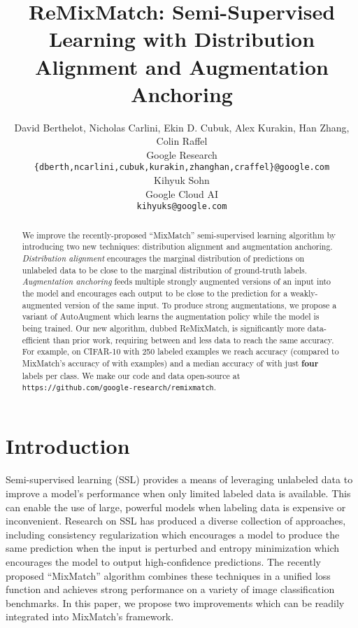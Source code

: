 \documentclass{article} \usepackage{iclr2020_conference,times}
\title{ReMixMatch: Semi-Supervised Learning with Distribution Alignment and Augmentation Anchoring}
\author{
  David Berthelot, Nicholas Carlini, Ekin D. Cubuk, Alex Kurakin, Han Zhang, Colin Raffel \\
  Google Research \\
  \texttt{\{dberth,ncarlini,cubuk,kurakin,zhanghan,craffel\}@google.com} \\
  \And
  Kihyuk Sohn \\
  Google Cloud AI \\
  \texttt{kihyuks@google.com}
}
\newif\ifarxiv\arxivtrue
\begin{document}
\maketitle
\ifarxiv
{}
\fi

\begin{abstract}

We improve the recently-proposed ``MixMatch'' semi-supervised learning algorithm 
by introducing two new techniques: distribution alignment and augmentation anchoring.
\emph{Distribution alignment} encourages the marginal distribution of predictions on unlabeled data to be close to the marginal distribution of ground-truth labels.
\emph{Augmentation anchoring} feeds multiple strongly augmented versions of an input into the model and encourages each output to be close to the prediction for a weakly-augmented version of the same input.
To produce strong augmentations, we propose a variant of AutoAugment which learns the augmentation policy while the model is being trained.
Our new algorithm, dubbed ReMixMatch, is
significantly more data-efficient than prior work,
requiring between  and  less data to reach the same accuracy.
For example, on CIFAR-10 with 250 labeled examples we reach  accuracy
(compared to MixMatch's accuracy of  with  examples)
and a median accuracy of  with just \textbf{four} labels per class.
We make our code and data open-source at
\texttt{https://github.com/google-research/remixmatch}.

\end{abstract}

\section{Introduction}

Semi-supervised learning (SSL) provides a means of leveraging unlabeled data to improve a model's performance when only limited labeled data is available.
This can enable the use of large, powerful models when labeling data is expensive or inconvenient.
Research on SSL has produced a diverse collection of approaches, including consistency regularization \citep{sajjadi2016regularization,laine2016temporal} which encourages a model to produce the same prediction when the input is perturbed and entropy minimization \citep{grandvalet2005semi} which encourages the model to output high-confidence predictions. 
The recently proposed ``MixMatch'' algorithm \citep{berthelot2019mixmatch} combines these techniques in a unified loss function and achieves strong performance on a variety of image classification benchmarks.
In this paper, we propose two improvements which can be readily integrated into MixMatch's framework.
\end{document}
